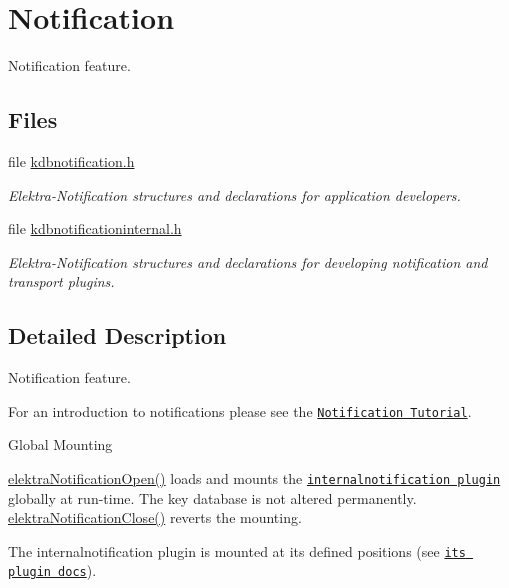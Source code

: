 \hypertarget{group__kdbnotification}{}\section{Notification}
\label{group__kdbnotification}


Notification feature.  


\subsection*{Files}
\begin{DoxyCompactItemize}
\item 
file \hyperlink{kdbnotification_8h}{kdbnotification.\+h}
\begin{DoxyCompactList}\small\item\em Elektra-\/\+Notification structures and declarations for application developers. \end{DoxyCompactList}\item 
file \hyperlink{kdbnotificationinternal_8h}{kdbnotificationinternal.\+h}
\begin{DoxyCompactList}\small\item\em Elektra-\/\+Notification structures and declarations for developing notification and transport plugins. \end{DoxyCompactList}\end{DoxyCompactItemize}


\subsection{Detailed Description}
Notification feature. 

For an introduction to notifications please see the \href{doc_tutorials_notifications_md.html}{\tt Notification Tutorial}.

\begin{DoxyParagraph}{Global Mounting}

\end{DoxyParagraph}
\hyperlink{kdbnotification_8h_aeae96154abdb5fdbf1b34a01e2b23e44}{elektra\+Notification\+Open()} loads and mounts the \href{https://www.libelektra.org/plugins/internalnotification}{\tt internalnotification plugin} globally at run-\/time. The key database is not altered permanently. \hyperlink{kdbnotification_8h_a5685dafbd4131011365628d6d9213594}{elektra\+Notification\+Close()} reverts the mounting.

The internalnotification plugin is mounted at its defined positions (see \href{https://www.libelektra.org/plugins/internalnotification}{\tt its plugin docs}).


